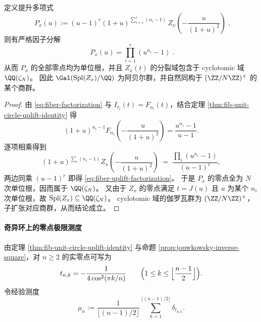 \begin{proposition}[提升因子化与阿贝尔分裂域]\label{prop:fiber-cyclotomic-splitting}
定义提升多项式
\begin{equation}\label{eq:fiber-uplift-poly}
\boxed{\;
P_x(u):=(u-1)^r(1+u)^{\sum_{i=1}^{r}(n_i-1)}\,
Z_x\!\left(-\frac{u}{(1+u)^2}\right)\; }.
\end{equation}
则有严格因子分解
\begin{equation}\label{eq:fiber-uplift-factorization}
\boxed{\;
P_x(u)=\prod_{i=1}^{r}(u^{n_i}-1)\; }.
\end{equation}
从而 \(P_x\) 的全部零点均为单位根，并且 \(Z_x(t)\) 的分裂域包含于 cyclotomic 域 \(\QQ(\zeta_N)\)。
因此 \(\Gal(\mathrm{Spl}(Z_x)/\QQ)\) 为阿贝尔群，并自然同构于 \((\ZZ/N\ZZ)^{\times}\) 的某个商群。
\end{proposition}
\begin{proof}
由 \eqref{eq:fiber-factorization} 与 \(I_{\ell_i}(t)=F_{n_i}(t)\)，结合定理 \ref{thm:fib-unit-circle-uplift-identity} 得
\[
(1+u)^{n_i-1}F_{n_i}\!\left(-\frac{u}{(1+u)^2}\right)=\frac{u^{n_i}-1}{u-1}.
\]
逐项相乘得到
\[
(1+u)^{\sum_i(n_i-1)}Z_x\!\left(-\frac{u}{(1+u)^2}\right)
\;=\;\frac{\prod_i(u^{n_i}-1)}{(u-1)^r},
\]
两边同乘 \((u-1)^r\) 即得 \eqref{eq:fiber-uplift-factorization}。
于是 \(P_x\) 的零点全为 \(N\) 次单位根，因而属于 \(\QQ(\zeta_N)\)。
又由于 \(Z_x\) 的零点满足 \(t=J(u)\) 且 \(u\) 为某个 \(n_i\) 次单位根，故 \(\mathrm{Spl}(Z_x)\subseteq\QQ(\zeta_N)\)。
cyclotomic 域的伽罗瓦群为 \((\ZZ/N\ZZ)^{\times}\)，子扩张对应商群，从而结论成立。
\end{proof}

\paragraph{奇异环上的零点极限测度}
由定理 \ref{thm:fib-unit-circle-uplift-identity} 与命题 \ref{prop:jouwkowsky-inverse-square}，对 \(n\ge 2\) 的实零点可写为
\begin{equation}\label{eq:fib-real-zeros-explicit}
t_{n,k}=-\frac{1}{4\cos^2(\pi k/n)}\qquad\Bigl(1\le k\le\Bigl\lfloor\frac{n-1}{2}\Bigr\rfloor\Bigr).
\end{equation}
令经验测度
\begin{equation}\label{eq:fib-empirical-measure}
\mu_n:=\frac{1}{\lfloor (n-1)/2\rfloor}\sum_{k=1}^{\lfloor (n-1)/2\rfloor}\delta_{t_{n,k}}.
\end{equation}

